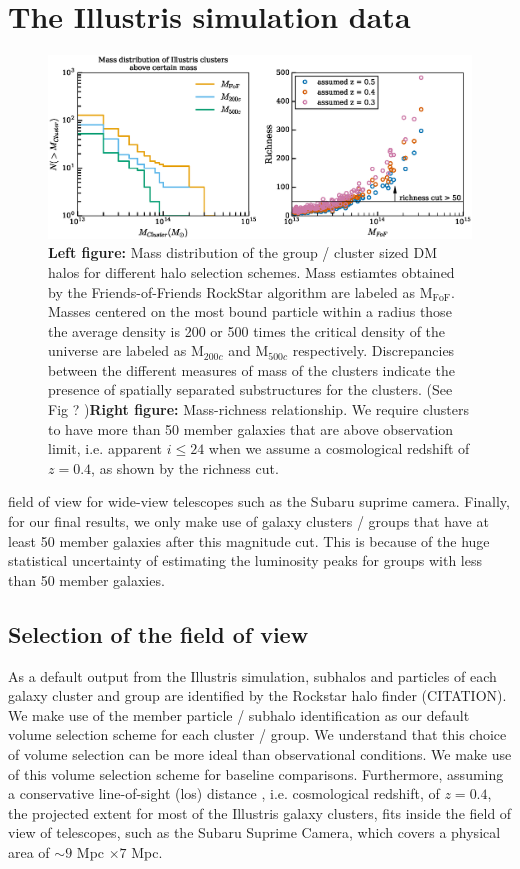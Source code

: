 \documentclass[usenatbib]{mn2e}
\begin{document}
\section{The Illustris simulation data} 
\label{sec:illustris_sim}
\begin{figure}
	\includegraphics[width=\linewidth]{./figures/finalized/clusterMassDist.eps}
	\caption{ {\bf Left figure:} Mass distribution of the group / cluster sized DM halos
		for different halo selection schemes. Mass estiamtes obtained by the
		Friends-of-Friends RockStar algorithm are labeled as  M$_{\text{FoF}}$.
		Masses centered on the most bound particle within a radius those the 
		average density is 200 or 500 times the critical density of the universe are 
		labeled as M$_{200c}$ and M$_{500c}$ respectively. 
		Discrepancies between the different
		measures of mass of the clusters indicate the presence of spatially
		separated substructures for the clusters. (See Fig ? ){\bf Right figure:} Mass-richness
	relationship. We require clusters to have more than 50 member galaxies that
	are above observation limit, i.e. apparent $i \leq 24$ when we assume a cosmological redshift
of $z=0.4$, as shown by the richness cut. \label{fig:mass_richness}}

\end{figure}

	field of view for wide-view telescopes such as the
Subaru suprime camera.
Finally, for our final results, we only make use of galaxy clusters / groups 
that have at least 50 member galaxies after this magnitude cut. This is because
of the huge statistical uncertainty of estimating the luminosity peaks for 
groups with less than 50 member galaxies. 

\subsection{Selection of the field of view}
\label{sec:FOV}
As a default output from the Illustris simulation, subhalos and particles of
each galaxy cluster and group are identified by the Rockstar halo finder
(CITATION). We make use of the member particle / subhalo identification as our
default volume selection scheme for each cluster / group.
We understand that this choice of volume selection can be more ideal than
observational conditions. We make use of this volume selection scheme
for baseline comparisons. 
Furthermore, assuming a conservative line-of-sight (los) distance 
, i.e. cosmological redshift, of $z = 0.4$, 
the projected extent for most of the Illustris galaxy clusters, 
fits inside the field of view of telescopes, such as the Subaru Suprime Camera,
which covers a physical area of $\sim 9$ Mpc $\times 7$ Mpc. 
\end{document}
